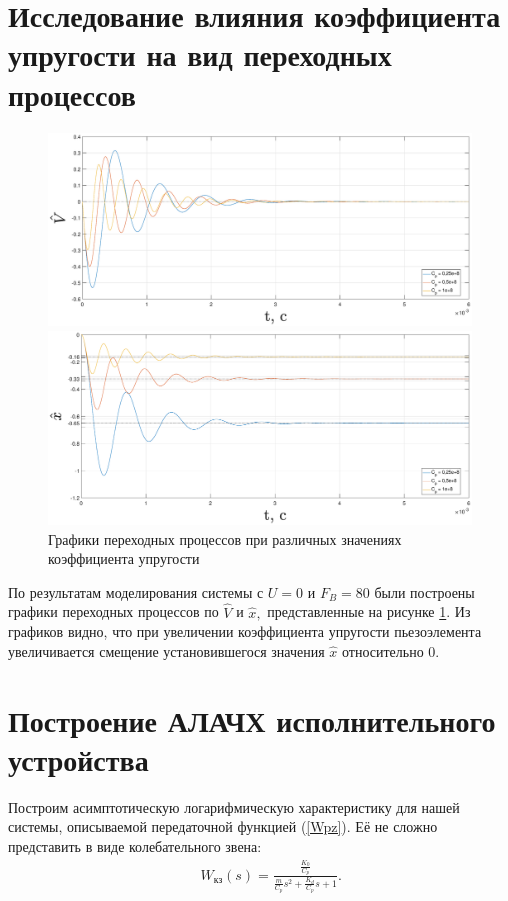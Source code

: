 \documentclass[fleqn, a4paper, 11pt, russian]{article}
\begin{document}
	\section{Исследование влияния коэффициента упругости на вид переходных процессов}
	\begin{figure}[ht!]
		\includegraphics[width = \textwidth]{Cvar/CvarV}
		
		\includegraphics[width = \textwidth]{Cvar/CvarX}
		\caption{Графики переходных процессов при различных значениях коэффициента упругости}
		\label{CvarGraph}
	\end{figure}
	
	По результатам моделирования системы с $U = 0$ и $F_B = 80$ были построены графики переходных процессов по $\hat{V}$ и $\hat{x},$ представленные на рисунке \ref{CvarGraph}. Из графиков видно, что при увеличении коэффициента упругости пьезоэлемента увеличивается смещение установившегося значения $\hat{x}$ относительно 0.
	\clearpage
	\section{Построение АЛАЧХ исполнительного устройства}
	Построим асимптотическую логарифмическую характеристику для нашей системы, описываемой передаточной функцией (\ref{Wpz}). Её не сложно представить в виде колебательного звена:
	\begin{align}
		&&W_\text{кз}(s) = \frac{\displaystyle{\frac{K_0}{C_p}}}{\displaystyle{\frac{m}{C_p}}s^2 + \frac{K_d}{C_p}s + 1}.
	\end{align}
	
\end{document}
